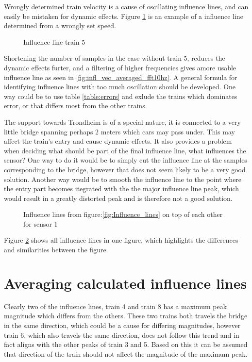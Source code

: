 Wrongly determined train velocity is a cause of oscillating influence lines, and can easily be mistaken for dynamic effects. Figure \ref{fig:train5_wrongSpeed} is an example of a influence line determined from a wrongly set speed.
\begin{figure}[H]
	\begin{adjustbox}{center}
		
	\end{adjustbox}
	\caption{Influence line train 5}
	\label{fig:train5_wrongSpeed}
\end{figure}
Shortening the number of samples in the case without train 5, reduces the dynamic effects furter, and a filtering of higher frequencies gives amore usable influence line as seen in \ref{fig:infl_vec_averaged_fft10hz}.
A general formula for identifying influence lines with too much oscillation should be developed. One way could be to use table \ref{table:errors} and exlude the trains which dominates error, or that differs most from the other trains.

The support towards Trondheim is of a special nature, it is connected to a very little bridge spanning perhaps 2 meters which cars may pass under. This may affect the train's entry and cause dynamic effects. It also provides a problem when deciding what should be part of the final influence line, what influences the sensor?
One way to do it would be to simply cut the influence line at the samples corresponding to the bridge, however that does not seem likely to be a very good solution. Another way would be to smooth the influence line to the point where the entry part becomes itegrated with the the major influence line peak, which would result in a greatly distorted peak and is therefore not a good solution.
\begin{figure}[H]
	\begin{adjustbox}{center}
		
	\end{adjustbox}
	\caption{Influence lines from figure:\ref{fig:Influence_lines} on top of each other for sensor 1}
	\label{fig:infl_all_trains}
\end{figure}

Figure \ref{fig:infl_all_trains} shows all influence lines in one figure, which highlights the differences and similarities between the figure.

\section{Averaging calculated influence lines}
Clearly two of the influence lines, train 4 and train 8 has a maximum peak magnitude which differs from the others. These two trains both travels the bridge in the same direction, which could be a cause for differing magnitudes, however train 6, which also travels the same direction, does not follow this trend and in fact aligns with the other peaks of train 3 and 5. Based on this it can be assumed that direction of the train should not affect the magnitude of the maximum peak.

